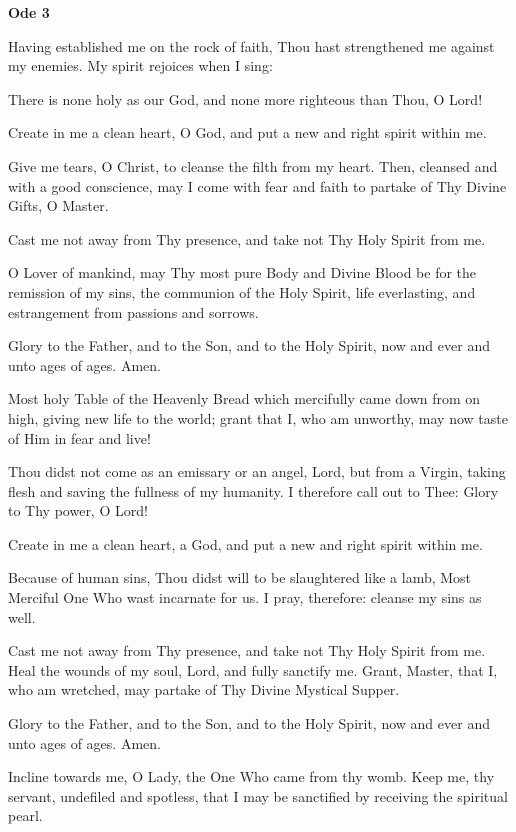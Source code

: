 \begin{center}
\textbf{Ode 3}
\end{center}

\begin{hang}
\noindent{}Having established me on the rock of faith, Thou hast strengthened me against my enemies. My spirit rejoices when I sing:

There is none holy as our God, and none more righteous than Thou, O Lord!

Create in me a clean heart, O God, and put a new and right spirit within me.

Give me tears, O Christ, to cleanse the filth from my heart. Then, cleansed and with a good conscience, may I come with fear and faith to partake of Thy Divine Gifts, O Master.

Cast me not away from Thy presence, and take not Thy Holy Spirit from me.

O Lover of mankind, may Thy most pure Body and Divine Blood be for the remission of my sins, the communion of the Holy Spirit, life everlasting, and estrangement from passions and sorrows.

Glory to the Father, and to the Son, and to the Holy Spirit, now and ever and unto ages of ages. Amen.

Most holy Table of the Heavenly Bread which mercifully came down from on high, giving new life to the world; grant that I, who am unworthy, may now taste of Him in fear and live! 

\end{hang}

\begin{hang}
\noindent{}Thou didst not come as an emissary or an angel, Lord, but from a Virgin, taking flesh and saving the fullness of my humanity. I therefore call out to Thee: Glory to Thy power, O Lord!

Create in me a clean heart, a God, and put a new and right spirit within me.

Because of human sins, Thou didst will to be slaughtered like a lamb, Most Merciful One Who wast incarnate for us. I pray, therefore: cleanse my sins as well.

Cast me not away from Thy presence, and take not Thy Holy Spirit from me. Heal the wounds of my soul, Lord, and fully sanctify me. Grant, Master, that I, who am wretched, may partake of Thy Divine Mystical Supper.

Glory to the Father, and to the Son, and to the Holy Spirit, now and ever and unto ages of ages. Amen.

Incline towards me, O Lady, the One Who came from thy womb. Keep me, thy servant, undefiled and spotless, that I may be sanctified by receiving the spiritual pearl.

\end{hang}

